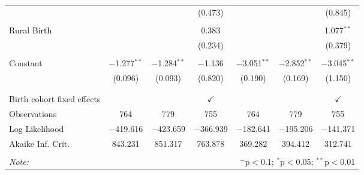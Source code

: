 \begin{table}[!htbp]
\begin{tabular}{@{\extracolsep{5pt}}lcccccc}
  &  &  & (0.473) &  &  & (0.845) \\ 
  & & & & & & \\ 
 Rural Birth &  &  & 0.383 &  &  & 1.077$^{**}$ \\ 
  &  &  & (0.234) &  &  & (0.379) \\ 
  & & & & & & \\ 
 Constant & $-$1.277$^{**}$ & $-$1.284$^{**}$ & $-$1.136 & $-$3.051$^{**}$ & $-$2.852$^{**}$ & $-$3.045$^{**}$ \\ 
  & (0.096) & (0.093) & (0.820) & (0.190) & (0.169) & (1.150) \\ 
  & & & & & & \\ 
\hline \\[-1.8ex] 
Birth cohort fixed effects &  &  & $\checkmark$ &  &  & $\checkmark$ \\ 
Observations & 764 & 779 & 755 & 764 & 779 & 755 \\ 
Log Likelihood & $-$419.616 & $-$423.659 & $-$366.939 & $-$182.641 & $-$195.206 & $-$141.371 \\ 
Akaike Inf. Crit. & 843.231 & 851.317 & 763.878 & 369.282 & 394.412 & 312.741 \\ 
\hline 
\hline \\[-1.8ex] 
\textit{Note:}  & \multicolumn{6}{r}{$^{+}$p$<$0.1; $^{*}$p$<$0.05; $^{**}$p$<$0.01}} \\ 
\end{tabular} 
\end{table} 
